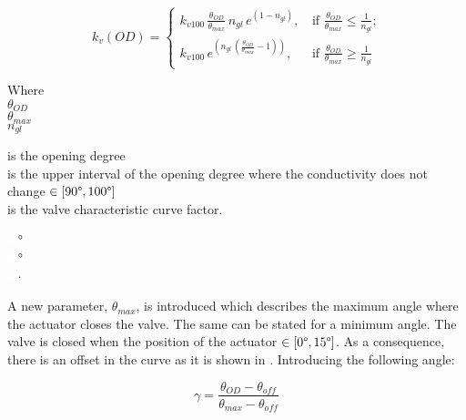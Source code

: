 \begin{equation}
\label{kvFunction}
 k_v(OD) =
		\left\{
		\begin{array}{ll}
		
		k_{v100} \, \frac{\theta_{OD}}{\theta_{max}} \, n_{gl} \, e^{(1-n_{gl})} \text{,} & \mbox{ if } 								\frac{\theta_{OD}}{\theta_{max}} \leq \frac{1}					{n_{gl}} \text{;}
\\
		k_{v100} \, e^{(n_{gl} \,(\frac{\theta_{OD}}{\theta_{max}}-1))} \text{,} & \mbox{ if } \frac{\theta_{OD}}{\theta_{max}} \geq \frac{1}{n_{gl}}

		\end{array}
		\right.
\end{equation}	

 \begin{minipage}[t]{0.20\textwidth}
Where\\
\hspace*{8mm} $\theta_{OD}$ \\
\hspace*{8mm} $\theta_{max}$ \\
\hspace*{8mm} $n_{gl}$ 
\end{minipage}
\begin{minipage}[t]{0.68\textwidth}
\vspace*{2mm}
is the opening degree\\ 
is the upper interval of the opening degree where the conductivity does not change $\in [90\degree, 100 \degree]$ \\
is the valve characteristic curve factor.

\end{minipage}
\begin{minipage}[t]{0.10\textwidth}
\vspace*{2mm}
\textcolor{White}{te}$\unit{\degree}$\\
\textcolor{White}{te}$\unit{\degree}$\\
\textcolor{White}{te}$\unit{\cdot}$
\end{minipage}	

A new parameter, $\theta_{max}$, is introduced which describes the maximum angle where the actuator closes the valve. The same can be stated for a minimum angle. The valve is closed when the position of the actuator $\in [0\degree,15\degree]$. As a consequence, there is an offset in the curve as it is shown in . Introducing the following angle:

\begin{equation}
\label{ValveAngle}
 \gamma =  \frac{\theta_{OD}-\theta_{off}}{\theta_{max}-\theta_{off}}
\end{equation}

